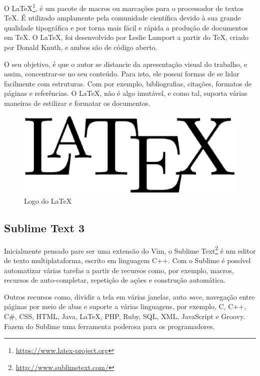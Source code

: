O \LaTeX\footnote{\url{https://www.latex-project.org}}, é um pacote de macros ou marcações para o processador de textos \TeX. É utilizado amplamente pela comunidade científica devido à sua grande qualidade tipográfica e por torna mais fácil e rápida a produção de documentos em \TeX. O \LaTeX, foi desenvolvido por Leslie Lamport a partir do \TeX, criado por Donald Knuth, e ambos são de código aberto.

O seu objetivo, é que o autor se distancie da apresentação visual do trabalho, e assim, concentrar-se no seu conteúdo. Para isto, ele possui formas de se lidar facilmente com estruturas. Com por exemplo, bibliografias, citações, formatos de páginas e referências. O \LaTeX, não é algo imutável, e como tal, suporta várias maneiras de estilizar e formatar os documentos.

\begin{figure}[!h]
	\centering
	\includegraphics[scale=0.3]{figuras/capitulo3/latex.eps}
	\caption{Logo do \LaTeX}
	\label{latex}
\end{figure}

\subsection{Sublime Text 3}

Inicialmente pensado pare ser uma extensão do Vim, o Sublime Text\footnote{\url{http://www.sublimetext.com/}} é um editor de texto multiplataforma, escrito em linguagem C++. Com o Sublime é possível automatizar várias tarefas a partir de recursos como, por exemplo, macros, recursos de auto-completar, repetição de ações e construção automática.

Outros recursos como, dividir a tela em várias janelas, auto \textit{save}, navegação entre páginas por meio de abas e suporte a várias linguagens, por exemplo, C, C++, C\#, CSS, HTML, Java, \LaTeX, PHP, Ruby, SQL, XML, JavaScript e Groovy. Fazem do Sublime uma ferramenta poderosa para os programadores.

